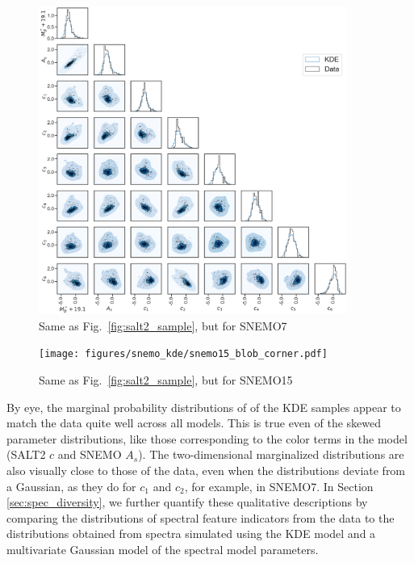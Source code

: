 \begin{figure}
    \centering
\includegraphics[width=0.9\textwidth]{figures/snemo_kde/snemo7_blob_corner.pdf}
    \caption{Same as Fig.~\ref{fig:salt2_sample}, but for SNEMO7}
    \label{fig:snemo7_sample}
\end{figure}

\begin{figure}
    \centering
\texttt{[image: figures/snemo\_kde/snemo15\_blob\_corner.pdf]}
    \caption{Same as Fig.~\ref{fig:salt2_sample}, but for SNEMO15}
    \label{fig:snemo15_sample}
\end{figure}

By eye, the marginal probability distributions of of the KDE samples appear to match the data quite well across all models. This is true even of the skewed parameter distributions, like those corresponding to the color terms in the model (SALT2 $c$ and SNEMO $A_s$). The two-dimensional marginalized distributions are also visually close to those of the data, even when the distributions deviate from a Gaussian, as they do for $c_1$ and $c_2$, for example, in SNEMO7. In Section \ref{sec:spec_diversity}, we further quantify these qualitative descriptions by comparing the distributions of spectral feature indicators from the data to the distributions obtained from spectra simulated using the KDE model and a multivariate Gaussian model of the spectral model parameters.


